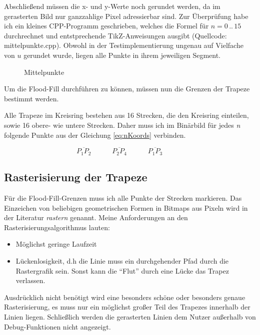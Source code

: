 	Abschließend müssen die x- und y-Werte noch gerundet werden, da im gerasterten Bild nur ganzzahlige Pixel adressierbar sind.
	Zur Überprüfung habe ich ein kleines CPP-Programm geschrieben, welches die Formel für \(n = 0\hspace{2pt}..\hspace{2pt}15 \) durchrechnet und entstprechende TikZ-Anweisungen ausgibt (Quellcode: mittelpunkte.cpp). Obwohl in der Testimplementierung ungenau auf Vielfache von \(u\) gerundet wurde, liegen alle Punkte in ihrem jeweiligen Segment.
	\begin{figure}[!ht]
		\centering
		
		\caption{Mittelpunkte}
	\end{figure}

	Um die Flood-Fill durchführen zu können, müssen nun die Grenzen der Trapeze bestimmt werden. 

	Alle Trapeze im Kreisring bestehen aus 16 Strecken, die den Kreisring einteilen, sowie 16 obere- wie untere Strecken. Daher muss ich im Binärbild für jedes \textit{n} folgende Punkte aus der Gleichung \eqref{eq:nKoords} verbinden.
	
	\begin{equation}
		\overline{P_1P_2} \hspace{3em}
		\overline{P_2P_4} \hspace{3em}
		\overline{P_1P_3} \hspace{3em}
	\end{equation}

\subsection{Rasterisierung der Trapeze}
	Für die Flood-Fill-Grenzen muss ich alle Punkte der Strecken markieren. Das Einzeichen von beliebigen geometrischen Formen in Bitmaps aus Pixeln wird in der Literatur \textit{rastern} genannt. Meine Anforderungen an den Rasterisierungsalgorithmus lauten:
	\begin{itemize}
		\item Möglichst geringe Laufzeit
		\item Lückenlosigkeit, d.h die Linie muss ein durchgehender Pfad durch die Rastergrafik sein. Sonst kann die "`Flut"' durch eine Lücke das Trapez verlassen.
	\end{itemize}
	Ausdrücklich nicht benötigt wird eine besonders schöne oder besonders genaue Rasterisierung, es muss nur ein möglichst großer Teil des Trapezes innerhalb der Linien liegen. Schließlich werden die gerasterten Linien dem Nutzer außerhalb von Debug-Funktionen nicht angezeigt.

